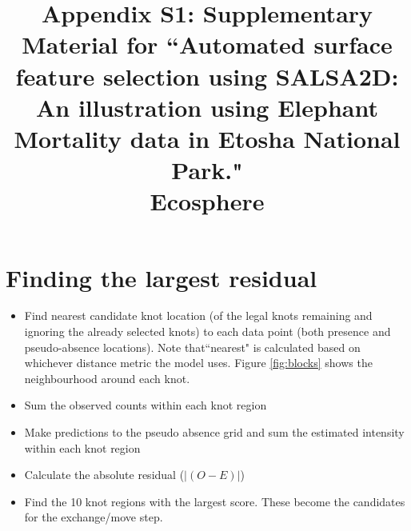 \usepackage{hyperref}
\usepackage{makecell}
\usepackage{longtable}
\usepackage[document]{ragged2e}
\usepackage{lineno}

\renewcommand{\figurename}{Figure}
\renewcommand{\thefigure}{S\arabic{figure}}
\renewcommand{\thetable}{S\arabic{table}}




\title{Appendix S1: Supplementary Material for ``Automated surface feature selection using SALSA2D: An illustration using Elephant Mortality data in Etosha National Park." \\ Ecosphere}


\author{
}

\maketitle %

\section{Finding the largest residual}

\begin{itemize}
    \item Find nearest candidate knot location (of the legal knots remaining and ignoring the already selected knots) to each data point (both presence and pseudo-absence locations). Note that``nearest" is calculated based on whichever distance metric the model uses. Figure \ref{fig:blocks} shows the neighbourhood around each knot.
    \item Sum the observed counts within each knot region
    \item Make predictions to the pseudo absence grid and sum the estimated intensity within each knot region
    \item Calculate the absolute residual ($|(O-E)|$)
    \item Find the 10 knot regions with the largest score.  These become the candidates for the exchange/move step.
\end{itemize}


